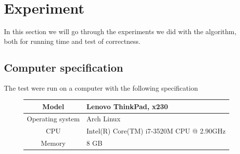\section{Experiment}
In this section we will go through the experiments we did with the algorithm,
both for running time and test of correctness.
\subsection{Computer specification}
The test were run on a computer with the following specification
\begin{figure}[H]
\begin{tabular}{| c | l |}
	\hline
	Model & Lenovo ThinkPad, x230 \\
	\hline
	Operating system & Arch Linux \\
	\hline
	CPU & Intel(R) Core(TM) i7-3520M CPU @ 2.90GHz\\
	\hline
	Memory & 8 GB \\
	\hline
\end{tabular}
\end{figure}
